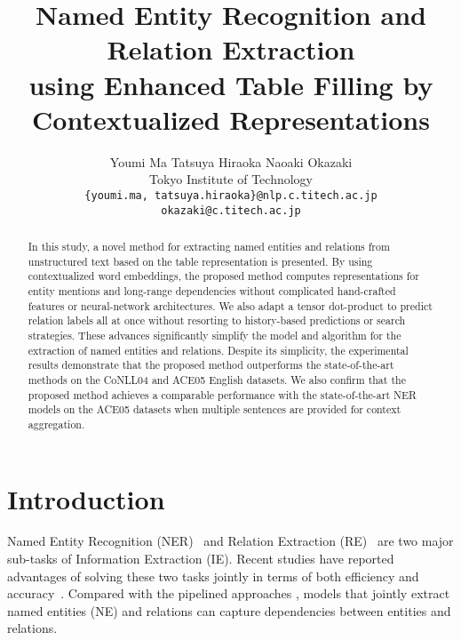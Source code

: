 \documentclass[11pt,a4paper]{article}
\title{Named Entity Recognition and Relation Extraction \\ using Enhanced Table Filling by Contextualized Representations}
\author{Youmi Ma \qquad
  Tatsuya Hiraoka \qquad
  Naoaki Okazaki \\
  Tokyo Institute of Technology \\
  \texttt{\{youmi.ma, tatsuya.hiraoka\}@nlp.c.titech.ac.jp} \\
   \texttt{okazaki@c.titech.ac.jp}
 }
\date{}
\begin{document}
\maketitle
\begin{abstract}
In this study, a novel method for extracting named entities and relations from unstructured text based on the table representation is presented. By using contextualized word embeddings, the proposed method computes representations for entity mentions and long-range dependencies without complicated hand-crafted features or neural-network architectures.
We also adapt a tensor dot-product to predict relation labels all at once without resorting to history-based predictions or search strategies. These advances significantly simplify the model and algorithm for the extraction of named entities and relations. Despite its simplicity, the experimental results demonstrate that the proposed method outperforms the state-of-the-art methods on the CoNLL04 and ACE05 English datasets. We also confirm that the proposed method achieves a comparable performance with the state-of-the-art NER models on the ACE05 datasets when multiple sentences are provided for context aggregation.
\end{abstract}

\section{Introduction}
\label{intro}

Named Entity Recognition (NER)~\cite{Nadeau:07,ratinov-roth-2009-design} and Relation Extraction (RE)~\cite{Zelenko:03,zhou-etal-2005-exploring} are two major sub-tasks of Information Extraction (IE).
Recent studies have reported advantages of solving these two tasks jointly in terms of both efficiency and accuracy~\cite{miwa-sasaki-2014-modeling,li-ji-2014-incremental,gupta-etal-2016-table,miwa-bansal-2016-end,zhang-etal-2017-end}. Compared with the pipelined approaches \cite{chan-roth-2011-exploiting}, models that jointly extract named entities (NE) and relations can capture dependencies between entities and relations.
\end{document}
